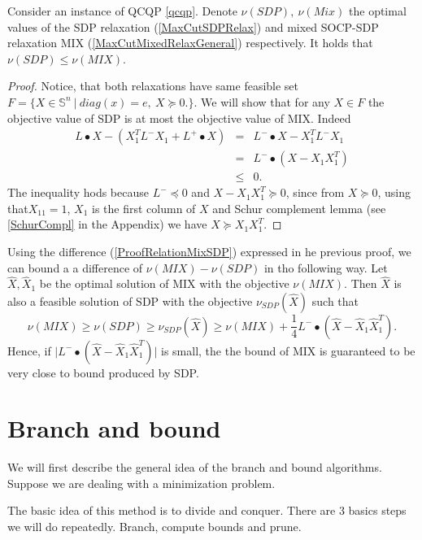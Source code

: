 \documentclass[12pt]{book}
\theoremstyle{definition}
\begin{document}
\thm Consider an instance of QCQP \ref{qcqp}. Denote $\nu(SDP), \ \nu(Mix)$ the optimal values of the SDP relaxation (\ref{MaxCutSDPRelax}) and mixed SOCP-SDP relaxation MIX (\ref{MaxCutMixedRelaxGeneral}) respectively. It holds that $\nu(SDP)\leq \nu(MIX)$.
\rm
\begin{proof}
Notice, that both relaxations have same feasible set $F = \{X\in \mathbb{S}^n \ \vert \ diag(x) = e,\ X\succeq 0.\}$. We will show that for any $X\in F$ the objective value of SDP is at most the objective value of MIX. Indeed
\begin{equation}
\label{ProofRelationMixSDP}
\begin{array}{rcl}
L\bullet X - ( X_1^TL^-X_1 + L^+\bullet X) 
& = & L^-\bullet X - X_1^TL^-X_1 \\ 
&=&  L^-\bullet (X - X_1 X_1^T) \\ 
&\leq & 0.
\end{array}
\end{equation}
The inequality hods because $L^-\preceq 0$ and $X-X_1X_1^T\succeq 0$,
since from $X\succeq 0$, using that$X_{11}=1$, $X_1$ is the first column of $X$ and Schur complement lemma (see \ref{SchurCompl} in the Appendix) we have $X\succeq X_1X_1^T.$ 
\end{proof}

\rem Using the difference (\ref{ProofRelationMixSDP}) expressed in he previous proof, we can bound a a difference of $\nu(MIX)-\nu(SDP)$ in tho following way. Let $\hat{X}, \hat{X}_1$ be the optimal solution of MIX with the objective $\nu(MIX)$. Then $\hat{X}$ is also a feasible solution of SDP with the objective $\nu_{SDP}(\hat{X})$ such that
$$\nu(MIX)\geq \nu(SDP) \geq \nu_{SDP}(\hat{X})\geq \nu(MIX) + \frac{1}{4}L^-\bullet (\hat{X} - \hat{X}_1 \hat{X}_1^T).$$
Hence, if $\vert L^-\bullet (\hat{X} - \hat{X}_1 \hat{X}_1^T)\vert$ is small, the the bound of MIX is guaranteed to be very close to bound produced by SDP. 






\section{Branch and bound}
\label{SectionBranchAndBound}



We will first describe the general idea of the branch and bound algorithms.  Suppose we are dealing with a minimization problem.

The basic idea of this method is to divide and conquer. There are 3 basics steps we will do repeatedly. Branch, compute bounds and prune.
\end{document}
